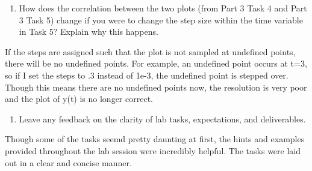 \documentclass[12pt]{article}
\begin{document}
\begin{enumerate}[resume]
    \item How does the correlation between the two plots (from Part 3 Task 4 and Part 3 Task 5) change if you were to change the step size within the time variable in Task 5? Explain why this happens.
\end{enumerate}
    \par If the steps are assigned such that the plot is not sampled at undefined points, there will be no undefined points. For example, an undefined point occurs at t=3, so if I set the steps to .3 instead of 1e-3, the undefined point is stepped over. Though this means there are no undefined points now, the resolution is very poor and the plot of y(t) is no longer correct.
    
\begin{enumerate}[resume]
    \item Leave any feedback on the clarity of lab tasks, expectations, and deliverables.
\end{enumerate}
    \par Though some of the tasks seemd pretty daunting at first, the hints and examples provided throughout the lab session were incredibly helpful. The tasks were laid out in a clear and concise manner.
    
\end{document}
